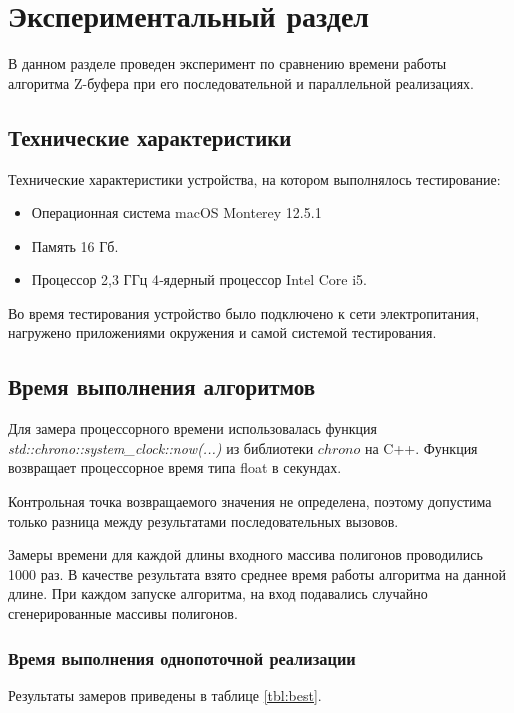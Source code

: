 \chapter{Экспериментальный раздел}
В данном разделе проведен эксперимент по сравнению
времени работы алгоритма Z-буфера при его последовательной и
параллельной реализациях.

\section{Технические характеристики}

Технические характеристики устройства, на котором выполнялось тестирование:

\begin{itemize}
	\item Операционная система macOS Monterey 12.5.1 
	\item Память 16 Гб.
	\item Процессор 2,3 ГГц 4‑ядерный процессор Intel Core i5.
\end{itemize}

Во время тестирования устройство было подключено к сети электропитания, нагружено приложениями окружения и самой  системой тестирования.


\section{Время выполнения алгоритмов} 

Для замера процессорного времени использовалась функция 
\\ \textit{std::chrono::system\_clock::now(...)} из библиотеки $chrono$ \cite{cpp-lang-chrono} на C++. Функция возвращает процессорное время типа float в секундах.

Контрольная точка возвращаемого значения не определена, поэтому допустима только разница между результатами последовательных вызовов.

Замеры времени для каждой длины входного массива полигонов проводились 1000 раз. В качестве результата взято среднее время работы алгоритма на данной длине. При каждом запуске алгоритма, на вход подавались случайно сгенерированные массивы полигонов. 

\subsection{Время выполнения однопоточной реализации}

Результаты замеров приведены в таблице \ref{tbl:best}.

